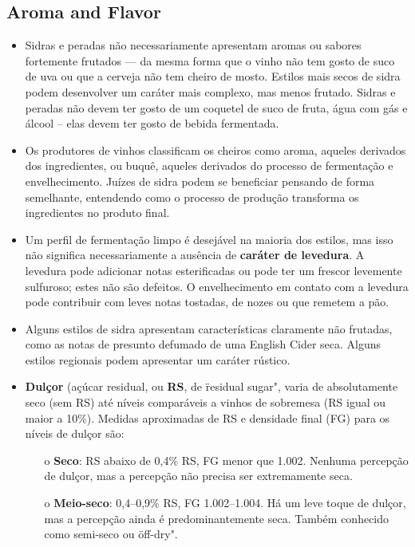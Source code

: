 \subsection*{Aroma and Flavor}

\begin{itemize}
\item Sidras e peradas não necessariamente apresentam aromas ou sabores fortemente frutados — da mesma forma que o vinho não tem gosto de suco de uva ou que a cerveja não tem cheiro de mosto. Estilos mais secos de sidra podem desenvolver um caráter mais complexo, mas menos frutado. Sidras e peradas não devem ter gosto de um coquetel de suco de fruta, água com gás e álcool – elas devem ter gosto de bebida fermentada.
\item Os produtores de vinhos classificam os cheiros como aroma, aqueles derivados dos ingredientes, ou buquê, aqueles derivados do processo de fermentação e envelhecimento. Juízes de sidra podem se beneficiar pensando de forma semelhante, entendendo como o processo de produção transforma os ingredientes no produto final.
\item Um perfil de fermentação limpo é desejável na maioria dos estilos, mas isso não significa necessariamente a ausência de \textbf{caráter de levedura}. A levedura pode adicionar notas esterificadas ou pode ter um frescor levemente sulfuroso; estes não são defeitos. O envelhecimento em contato com a levedura pode contribuir com leves notas tostadas, de nozes ou que remetem a pão.
\item Alguns estilos de sidra apresentam características claramente não frutadas, como as notas de presunto defumado de uma English Cider seca. Alguns estilos regionais podem apresentar um caráter rústico.
\item \textbf{Dulçor} (açúcar residual, ou \textbf{RS}, de \"residual sugar"\), varia de absolutamente seco (sem RS) até níveis comparáveis a vinhos de sobremesa (RS igual ou maior a 10\%). Medidas aproximadas de RS e densidade final (FG) para os níveis de dulçor são:
  \begin{itemize}
  \item[o] \textbf{Seco}: RS abaixo de 0,4\% RS, FG menor que 1.002. Nenhuma percepção de dulçor, mas a percepção não precisa ser extremamente seca.
  \item[o] \textbf{Meio-seco}: 0,4–0,9\% RS, FG 1.002–1.004. Há um leve toque de dulçor, mas a percepção ainda é predominantemente seca. Também conhecido como semi-seco ou \"off-dry".

\end{itemize}
\end{itemize}
